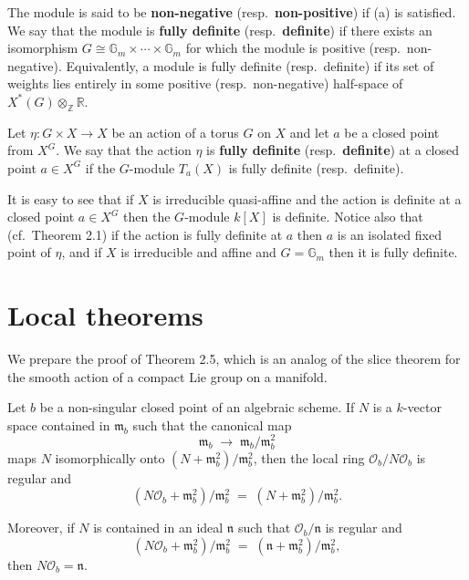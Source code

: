 \documentclass[12pt]{article}
\begin{document}
The module is said to be \textbf{non-negative} (resp.\ \textbf{non-positive}) 
if (a) is satisfied. We say that the module is \textbf{fully definite} 
(resp.\ \textbf{definite}) if there exists an isomorphism 
$G \cong \mathbb{G}_m \times \cdots \times \mathbb{G}_m$ for which the 
module is positive (resp.\ non-negative). Equivalently, a module is fully definite (resp.\ definite) if its set of weights lies entirely in some positive (resp.\ non-negative) half-space of $X^*(G)\otimes_\mathbb{Z} \mathbb{R}$.

\medskip

Let $\eta: G \times X \to X$ be an action of a torus $G$ on $X$ and let $a$ 
be a closed point from $X^G$. We say that the action $\eta$ is 
\textbf{fully definite} (resp.\ \textbf{definite}) at a closed point 
$a \in X^G$ if the $G$-module $T_a(X)$ is fully definite (resp.\ definite).  

It is easy to see that if $X$ is irreducible quasi-affine and the action 
is definite at a closed point $a \in X^G$ then the $G$-module $k[X]$ 
is definite. Notice also that (cf.\ Theorem 2.1) if the action is fully definite 
at $a$ then $a$ is an isolated fixed point of $\eta$, and if $X$ is irreducible 
and affine and $G = \mathbb{G}_m$ then it is fully definite.

\section{Local theorems}
We prepare the proof of Theorem 2.5, which is an analog of the slice theorem for the smooth action of a compact Lie group on a manifold. 
\begin{lemma}[2.1]
Let $b$ be a non-singular closed point of an algebraic scheme.  
If $N$ is a $k$-vector space contained in $\mathfrak{m}_b$ such that the canonical map  
\[
   \mathfrak{m}_b \;\longrightarrow\; \mathfrak{m}_b / \mathfrak{m}_b^2
\]
maps $N$ isomorphically onto $(N + \mathfrak{m}_b^2)/\mathfrak{m}_b^2$, then the local ring 
$\mathcal{O}_b / N\mathcal{O}_b$ is regular and
\[
   (N\mathcal{O}_b + \mathfrak{m}_b^2)/\mathfrak{m}_b^2 \;=\; (N + \mathfrak{m}_b^2)/\mathfrak{m}_b^2.
\]

Moreover, if $N$ is contained in an ideal $\mathfrak{n}$ such that $\mathcal{O}_b/\mathfrak{n}$ 
is regular and 
\[
   (N\mathcal{O}_b + \mathfrak{m}_b^2)/\mathfrak{m}_b^2 \;=\; (\mathfrak{n} + \mathfrak{m}_b^2)/\mathfrak{m}_b^2,
\]
then $N\mathcal{O}_b = \mathfrak{n}$.
\end{lemma}
\end{document}
